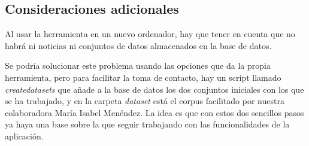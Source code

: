 \subsection{Consideraciones adicionales}

Al usar la herramienta en un nuevo ordenador, hay que tener en cuenta que no habrá ni noticias ni conjuntos de datos almacenados en la base de datos. 

Se podría solucionar este problema usando las opciones que da la propia herramienta, pero para facilitar la toma de contacto, hay un script llamado \emph{createdatasets} que añade a la base de datos los dos conjuntos iniciales con los que se ha trabajado, y en la carpeta \emph{dataset} está el corpus facilitado por nuestra colaboradora María Isabel Menéndez. La idea es que con estos dos sencillos pasos ya haya una base sobre la que seguir trabajando con las funcionalidades de la aplicación.
